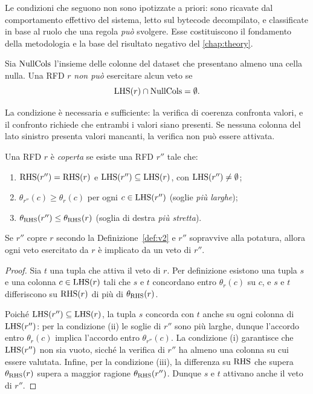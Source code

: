 Le condizioni che seguono non sono ipotizzate a priori: sono ricavate dal comportamento effettivo
del sistema, letto sul bytecode decompilato, e classificate in base al ruolo che una regola
\emph{può} svolgere. Esse costituiscono il fondamento della metodologia e la base del risultato
negativo del \autoref{chap:theory}.

\begin{definition}\label{def:v1}
Sia $\mathrm{NullCols}$ l'insieme delle colonne del dataset che presentano almeno una cella nulla. Una
RFD $r$ \emph{non può} esercitare alcun veto se
\[
    \mathrm{LHS}(r) \cap \mathrm{NullCols} = \emptyset .
\]
\end{definition}

La condizione è necessaria e sufficiente: la verifica di coerenza confronta valori, e il confronto
richiede che entrambi i valori siano presenti. Se nessuna colonna del lato sinistro presenta
valori mancanti, la verifica non può essere attivata.

\begin{definition}\label{def:v2}
Una RFD $r$ è \emph{coperta} se esiste una RFD $r''$ tale che:
\begin{enumerate}[label=(\roman*),leftmargin=1.8em]
    \item $\mathrm{RHS}(r'') = \mathrm{RHS}(r)$ e $\mathrm{LHS}(r'') \subseteq \mathrm{LHS}(r)$, con $\mathrm{LHS}(r'') \neq \emptyset$;
    \item $\theta_{r''}(c) \ge \theta_r(c)$ per ogni $c \in \mathrm{LHS}(r'')$ (soglie \emph{più larghe});
    \item $\theta_{\mathrm{RHS}}(r'') \le \theta_{\mathrm{RHS}}(r)$ (soglia di destra \emph{più stretta}).
\end{enumerate}
\end{definition}

\begin{proposition}\label{prop:v2}
Se $r''$ copre $r$ secondo la Definizione~\ref{def:v2} e $r''$ sopravvive alla potatura, allora ogni veto
esercitato da $r$ è implicato da un veto di $r''$.
\end{proposition}

\begin{proof}
Sia $t$ una tupla che attiva il veto di $r$. Per definizione esistono una tupla $s$ e una colonna
$c \in \mathrm{LHS}(r)$ tali che $s$ e $t$ concordano entro $\theta_r(c)$ su $c$, e $s$ e $t$ differiscono
su $\mathrm{RHS}(r)$ di più di $\theta_{\mathrm{RHS}}(r)$.

Poiché $\mathrm{LHS}(r'') \subseteq \mathrm{LHS}(r)$, la tupla $s$ concorda con $t$ anche su ogni colonna di
$\mathrm{LHS}(r'')$: per la condizione (ii) le soglie di $r''$ sono più larghe, dunque l'accordo entro
$\theta_r(c)$ implica l'accordo entro $\theta_{r''}(c)$. La condizione (i) garantisce che
$\mathrm{LHS}(r'')$ non sia vuoto, sicché la verifica di $r''$ ha almeno una colonna su cui essere
valutata. Infine, per la condizione (iii), la differenza su $\mathrm{RHS}$ che supera $\theta_{\mathrm{RHS}}(r)$
supera a maggior ragione $\theta_{\mathrm{RHS}}(r'')$. Dunque $s$ e $t$ attivano anche il veto di $r''$.
\end{proof}

